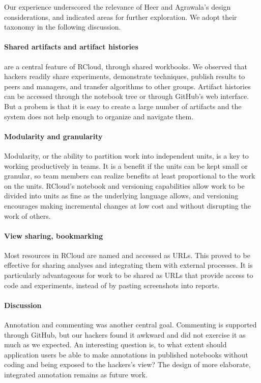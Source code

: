 Our experience underscored the relevance of Heer and Agrawala's design
considerations, and indicated areas for further exploration. We adopt
their taxonomy in the following discussion.

\paragraph*{Shared artifacts and artifact histories} are a central feature
of RCloud, through shared workbooks. We observed that hackers readily
share experiments, demonstrate techniques, publish results to peers and
managers, and transfer algorithms to other groups. Artifact histories
can be accessed through the notebook tree or through GitHub's web interface.
But a probem is that it is easy to create a large number of artifacts
and the system does not help enough to organize and navigate them.

\paragraph*{Modularity and granularity} Modularity, or the ability
to partition work into independent units, is a key to working
productively in teams.
It is a benefit if the units can be kept small or granular, so team members
can realize benefits at least proportional to the work on the units.
RCloud's notebook and versioning capabilities allow work to be divided
into units as fine as the underlying language allows, and versioning
encourages making incremental changes at low cost and without disrupting
the work of others.

\paragraph*{View sharing, bookmarking} Most resources in RCloud are named
and accessed as URLs. This proved to be effective for sharing analyses
and integrating them with external processes.  It is particularly
advantageous for work to be shared as URLs that provide access to code
and experiments, instead of by pasting screenshots into reports.

\paragraph*{Discussion} Annotation and commenting was another central goal.
Commenting is supported through GitHub, but our hackers found it
awkward and did not exercise it as much as we expected.
An interesting question is, to what extent should application users
be able to make annotations in published notebooks without coding
and being exposed to the hackers's view? The design of
more elaborate, integrated annotation remains as future work.

